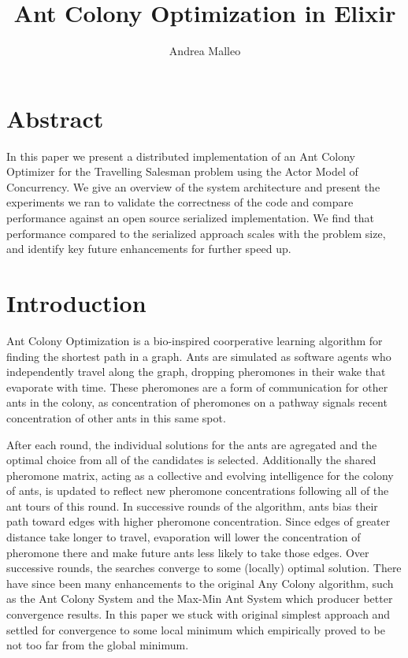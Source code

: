 \documentclass[12pt]{article}
\title{Ant Colony Optimization in Elixir}
\author{Andrea Malleo}
\begin{document}
\maketitle
\section{Abstract}
In this paper we present a distributed implementation of an Ant Colony Optimizer 
for the Travelling Salesman problem using the Actor Model of Concurrency. We give
an overview of the system architecture and present the experiments we ran to validate 
the correctness of the code and compare performance against an open source serialized 
implementation. We find that performance compared to the serialized approach scales 
with the problem size, and identify key future enhancements for further speed up.


\section{Introduction}Ant Colony Optimization \cite{Dorigo1997AntCS} is a bio-inspired coorperative learning algorithm for 
    finding the shortest path in a graph. Ants are simulated as software agents who 
    independently travel along the graph, dropping pheromones in their wake that 
    evaporate with time. These pheromones are a form of communication for other ants in
    the colony, as concentration of pheromones on a pathway signals recent concentration of other ants
    in this same spot.

    After each round, the individual solutions for the ants are agregated and the optimal choice
    from all of the candidates is selected. 
    Additionally the shared pheromone matrix, acting as a collective and evolving intelligence 
    for the colony of ants, is updated to reflect new pheromone concentrations following all of the 
    ant tours of this round.  In successive rounds of the algorithm, ants bias their path 
    toward edges with higher pheromone concentration. Since edges of greater distance take 
    longer to travel, evaporation will lower the concentration of pheromone there and make 
    future ants less likely to take those edges. Over successive rounds, the searches converge
    to some (locally) optimal solution. 
    There have since been many enhancements to the original Any Colony algorithm,
    such as the Ant Colony System \cite{Dorigo1999AntCO} and the Max-Min Ant System \cite{maxMin} 
    which producer better convergence results. In this paper we stuck with original simplest 
    approach and settled for convergence to some local minimum which empirically proved to be 
    not too far from the global minimum.\\
\end{document}
